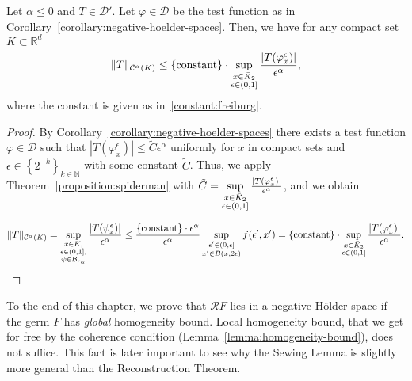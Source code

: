 \begin{corollary}\label{corollary:c-alpha-norm-estimate}
  Let \( \alpha \leq 0 \) and \( T \in \mathcal{D}' \). Let \( \varphi \in \mathcal{D} \) be the test function as in Corollary~\ref{corollary:negative-hoelder-spaces}. Then, we have for any compact set \( K \subset \mathbb{R}^d \)
  \begin{align*}
    \lVert T \rVert_{\mathcal{C}^\alpha(K)} \leq \{ \mathrm{constant} \} \cdot \sup_{\substack{x \in \bar{K}_{2} \\ \epsilon \in (0,1]}} 
    \frac{|T(\varphi^{\epsilon}_x)|}{\epsilon^\alpha},
  \end{align*}
  where the constant is given as in~\eqref{constant:freiburg}.
\end{corollary}

\begin{proof}
  By Corollary~\ref{corollary:negative-hoelder-spaces} there exists a test function \( \varphi \in \mathcal{D} \) such that \( |T(\varphi^\epsilon_x)| \leq \tilde C \epsilon^\alpha  \) uniformly for \( x \) in compact sets and \( \epsilon \in \left\{ 2^{-k} \right\}_{k \in \mathbb{N}} \) with some constant \( \tilde C \). Thus, we apply Theorem~\ref{proposition:spiderman} with \( \tilde C = \sup\limits_{\substack{x \in \bar{K}_{2} \\ \epsilon \in (0,1]}} \frac{|T(\varphi^{\epsilon}_x)|}{\epsilon^\alpha} \), and we obtain

  \begin{align*}
    \lVert T \rVert_{\mathcal{C}^\alpha(K)} 
    = \sup_{
      \substack{
        x \in K,\\
        \epsilon \in (0,1],\\
        \psi \in \mathcal{B}_{r_\alpha}
      }
    } \frac{|T(\psi^\epsilon_x)|}{\epsilon^\alpha}
    \leq 
    \frac{
      \{ \mathrm{constant} \} \cdot \epsilon^\alpha
    }{
      \epsilon^\alpha
    }
    \sup\limits_{
        \substack{
          \epsilon' \in (0, \epsilon]\\
          x' \in B(x, 2\epsilon)
        }
      } f(\epsilon', x') = \{ \mathrm{constant} \} \cdot \sup_{\substack{x \in \bar{K}_{2} \\ \epsilon \in (0,1]}} 
      \frac{|T(\varphi^{\epsilon}_x)|}{\epsilon^\alpha}.
  \end{align*}
\end{proof}

To the end of this chapter, we prove that  \( \mathcal{R}F \) lies in a negative Hölder-space if the germ \( F \) has \emph{global} homogeneity bound. Local homogeneity bound, that we get for free by the coherence condition (Lemma~\ref{lemma:homogeneity-bound}), does not suffice. This fact is later important to see why the Sewing Lemma is slightly more general than the Reconstruction Theorem.

